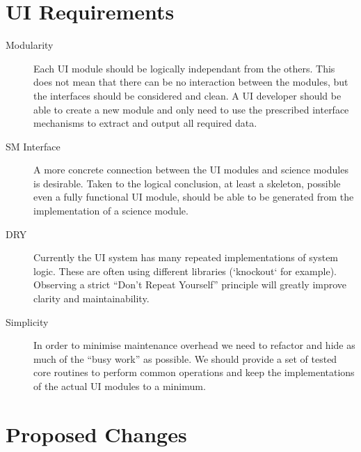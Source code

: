 \documentclass[12pt]{scrartcl}
\begin{document}
\maketitle

\section{UI Requirements}

\begin{description}
\item[Modularity] Each UI module should be logically independant from the others. This
  does not mean that there can be no interaction between the modules, but the interfaces
  should be considered and clean. A UI developer should be able to create a new module and
  only need to use the prescribed interface mechanisms to extract and output all required
  data.
\item[SM Interface] A more concrete connection between the UI modules and science modules
  is desirable. Taken to the logical conclusion, at least a skeleton, possible even a fully
  functional UI module, should be able to be generated from the implementation of a science
  module.
\item[DRY] Currently the UI system has many repeated implementations of system logic. These
  are often using different libraries (`knockout` for example). Observing a strict ``Don't
  Repeat Yourself'' principle will greatly improve clarity and maintainability.
\item[Simplicity] In order to minimise maintenance overhead we need to refactor and hide as
  much of the ``busy work'' as possible. We should provide a set of tested core routines to perform
  common operations and keep the implementations of the actual UI modules to a minimum.
\end{description}

\section{Proposed Changes}
\end{document}
